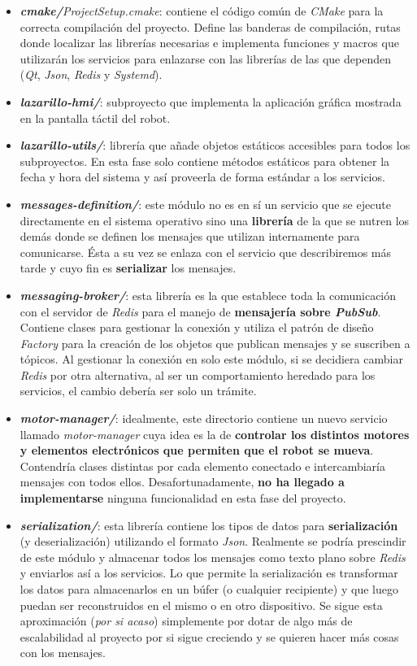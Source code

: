 \begin{itemize}
	\item \textit{\textbf{cmake/}ProjectSetup.cmake}: contiene el código común de \textit{CMake} para la correcta compilación del proyecto. Define las banderas de compilación, rutas donde localizar las librerías necesarias e implementa funciones y macros que utilizarán los servicios para enlazarse con las librerías de las que dependen (\textit{Qt}, \textit{Json}, \textit{Redis} y \textit{Systemd}).
	\item \textit{\textbf{lazarillo-hmi/}}: subproyecto que implementa la aplicación gráfica mostrada en la pantalla táctil del robot.
	\item \textit{\textbf{lazarillo-utils/}}: librería que añade objetos estáticos accesibles para todos los subproyectos. En esta fase solo contiene métodos estáticos para obtener la fecha y hora del sistema y así proveerla de forma estándar a los servicios.
	\item \textit{\textbf{messages-definition/}}: este módulo no es en sí un servicio que se ejecute directamente en el sistema operativo sino una \textbf{librería} de la que se nutren los demás donde se definen los mensajes que utilizan internamente para comunicarse. Ésta a su vez se enlaza con el servicio que describiremos más tarde y cuyo fin es \textbf{serializar} los mensajes.
	\item \textit{\textbf{messaging-broker/}}: esta librería es la que establece toda la comunicación con el servidor de \textit{Redis} para el manejo de \textbf{mensajería sobre \textit{PubSub}}. Contiene clases para gestionar la conexión y utiliza el patrón de diseño \textit{Factory} para la creación de los objetos que publican mensajes y se suscriben a tópicos. Al gestionar la conexión en solo este módulo, si se decidiera cambiar \textit{Redis} por otra alternativa, al ser un comportamiento heredado para los servicios, el cambio debería ser solo un trámite.
	\item \textit{\textbf{motor-manager/}}: idealmente, este directorio contiene un nuevo servicio llamado \textit{motor-manager} cuya idea es la de \textbf{controlar los distintos motores y elementos electrónicos que permiten que el robot se mueva}. Contendría clases distintas por cada elemento conectado e intercambiaría mensajes con todos ellos. Desafortunadamente, \textbf{no ha llegado a implementarse} ninguna funcionalidad en esta fase del proyecto.
	\item \textit{\textbf{serialization/}}: esta librería contiene los tipos de datos para \textbf{serialización} (y deserialización) utilizando el formato \textit{Json}. Realmente se podría prescindir de este módulo y almacenar todos los mensajes como texto plano sobre \textit{Redis} y enviarlos así a los servicios. Lo que permite la serialización es transformar los datos para almacenarlos en un búfer (o cualquier recipiente) y que luego puedan ser reconstruidos en el mismo o en otro dispositivo. Se sigue esta aproximación (\textit{por si acaso}) simplemente por dotar de algo más de escalabilidad al proyecto por si sigue creciendo y se quieren hacer más cosas con los mensajes.

\end{itemize}
